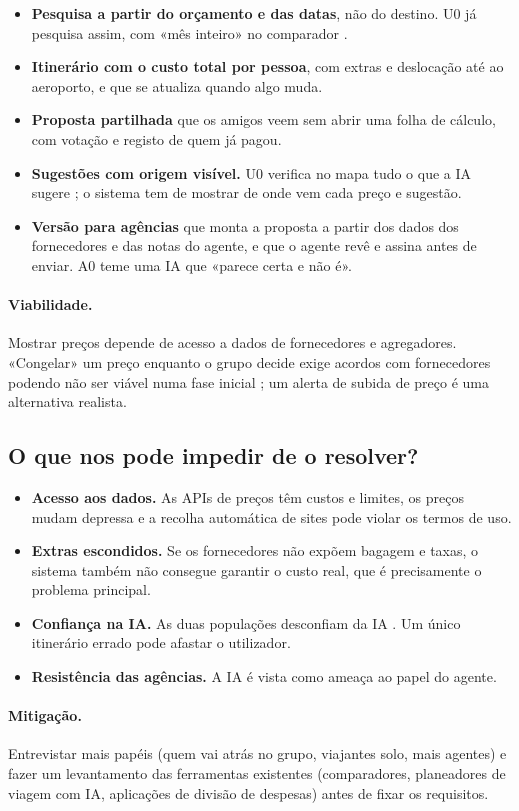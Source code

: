 \begin{itemize}
  \item \textbf{Pesquisa a partir do orçamento e das datas}, não do destino. U0 já pesquisa assim, com «mês inteiro» no comparador .
  \item \textbf{Itinerário com o custo total por pessoa}, com extras e deslocação até ao aeroporto, e que se atualiza quando algo muda.
  \item \textbf{Proposta partilhada} que os amigos veem sem abrir uma folha de cálculo, com votação e registo de quem já pagou.
  \item \textbf{Sugestões com origem visível.} U0 verifica no mapa tudo o que a IA sugere ; o sistema tem de mostrar de onde vem cada preço e sugestão.
  \item \textbf{Versão para agências} que monta a proposta a partir dos dados dos fornecedores e das notas do agente, e que o agente revê e assina antes de enviar. A0 teme uma IA que «parece certa e não é».
\end{itemize}

\paragraph{Viabilidade.} Mostrar preços depende de acesso a dados de fornecedores e agregadores. «Congelar» um preço enquanto o grupo decide exige acordos com fornecedores podendo não ser viável numa fase inicial
; um alerta de subida de preço é uma alternativa realista.

\subsection{O que nos pode impedir de o resolver?}

\begin{itemize}
  \item \textbf{Acesso aos dados.} As APIs de preços têm custos e limites, os preços mudam depressa e a recolha automática de sites pode violar os termos de uso.
  \item \textbf{Extras escondidos.} Se os fornecedores não expõem bagagem e taxas, o sistema também não consegue garantir o custo real, que é precisamente o problema principal.
  \item \textbf{Confiança na IA.} As duas populações desconfiam da IA . Um único itinerário errado pode afastar o utilizador.
  \item \textbf{Resistência das agências.} A IA é vista como ameaça ao papel do agente.
\end{itemize}

\paragraph{Mitigação.} Entrevistar mais papéis (quem vai atrás no grupo, viajantes solo, mais agentes) e fazer um 
levantamento das ferramentas existentes (comparadores, planeadores de viagem com IA, aplicações de divisão de despesas) antes de fixar os requisitos.

